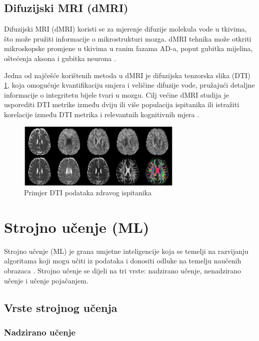 \documentclass[zavrsnirad,upload]{fer}
\begin{document}
\section{Difuzijski MRI (dMRI)}
Difuzijski MRI (dMRI) koristi se za mjerenje difuzije molekula vode u tkivima, što može pružiti informacije o mikrostrukturi mozga. dMRI tehnika može otkriti mikroskopske promjene u tkivima u ranim fazama AD-a, poput gubitka mijelina, oštećenja aksona i gubitka neurona \cite{Promteangtrong2015}.

Jedna od najčešće korištenih metoda u dMRI je difuzijska tenzorska slika (DTI) \ref{fig:dMRI}, koja omogućuje kvantifikaciju smjera i veličine difuzije vode, pružajući detaljne informacije o integritetu bijele tvari u mozgu. Cilj većine dMRI studija je usporediti DTI metrike između dviju ili više populacija ispitanika ili istražiti korelacije između DTI metrika i relevantnih kognitivnih mjera \cite{mueller2015diffusion}.

\begin{figure}[h]
	\centering
	\includegraphics[width=0.7\textwidth]{Figures/dMRI.jpg}
	\caption{Primjer DTI podataka zdravog ispitanika \cite{mueller2015diffusion}}
	\label{fig:dMRI}
\end{figure}


\chapter{Strojno učenje (ML)}
Strojno učenje (ML) je grana umjetne inteligencije koja se temelji na razvijanju algoritama koji mogu učiti iz podataka i donositi odluke na temelju naučenih obrazaca \cite{ml_book}. Strojno učenje se dijeli na tri vrste: nadzirano učenje, nenadzirano učenje i učenje pojačanjem.

\section{Vrste strojnog učenja}

\subsection{Nadzirano učenje}
\end{document}
